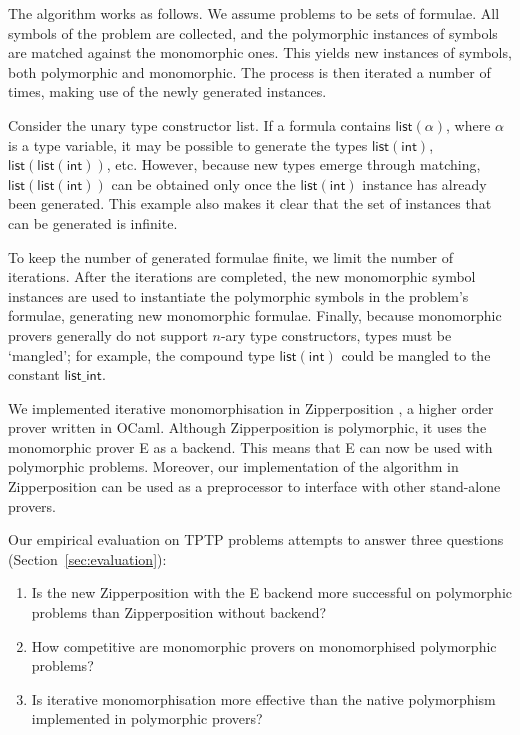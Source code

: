 \documentclass[]{ceurart}
\newcommand\ty[1]{\textsf{#1}}
\begin{document}
The algorithm works as follows. We assume problems to be sets of formulae. All symbols of the problem are collected, and the polymorphic instances of symbols are matched against the monomorphic ones. This yields new instances of symbols, both polymorphic and monomorphic. The process is then iterated
a number of times, making use of the newly generated instances.

Consider the unary type constructor \ty{list}. If a formula contains $\ty{list}(\alpha)$, where $\alpha$ is a type variable, it may be possible to generate the types $\ty{list}(\ty{int})$, $\ty{list}(\ty{list}(\ty{int}))$, etc. However, because new types emerge through matching, $\ty{list}(\ty{list}(\ty{int}))$ can be obtained only once the $\ty{list}(\ty{int})$ instance has already been generated. This example also makes it clear that the set of instances that can be generated is infinite.

To keep the number of generated formulae finite, we limit the number of iterations. After the iterations are completed, the new monomorphic symbol instances are used to instantiate the polymorphic symbols in the problem's formulae, generating new monomorphic formulae. Finally, because monomorphic provers generally do not support $n$-ary type constructors, types must be `mangled'; for example, the compound type $\ty{list}(\ty{int})$ could be mangled to the constant $\ty{list\_int}$.

We implemented iterative monomorphisation in Zipperposition \cite{zipp}, a higher order prover written in OCaml. Although Zipperposition is polymorphic, it uses the monomorphic prover E \cite{e} as a backend. This means that E can now be used with polymorphic problems. Moreover, our implementation of the algorithm in Zipperposition can be used as a preprocessor to interface with other stand-alone provers.

Our empirical evaluation on TPTP \cite{tptp} problems attempts to answer three questions (Section~\ref{sec:evaluation}):
\begin{enumerate}
\item Is the new Zipperposition with the E backend more successful on polymorphic problems than Zipperposition without backend?

\item How competitive are monomorphic provers on monomorphised polymorphic problems?

\item Is iterative monomorphisation more effective than the native polymorphism implemented in polymorphic provers?
\end{enumerate}
\end{document}
